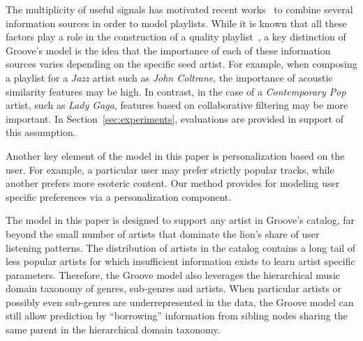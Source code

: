 The multiplicity of useful signals has motivated recent works~\cite{personalized_playlist_schedl,McFee_multi_similarities} to combine several information sources in order to model playlists. %
While it is known that all these factors play a role in the construction of a quality playlist~\cite{Cunningham:06}, a key distinction of Groove's model is the idea that the importance of each of these information sources varies depending on the specific seed artist. For example, when composing a playlist for a \textit{Jazz} artist such as \textit{John Coltrane}, the importance of acoustic similarity features may be high. In contrast, in the case of a \textit{Contemporary Pop} artist, such as \textit{Lady Gaga}, features based on collaborative filtering may be more important. In Section~\ref{sec:experiments}, evaluations are provided in support of this assumption.
 
Another key element of the model in this paper is personalization based on the user. For example, a particular user may prefer strictly popular tracks, while another prefers more esoteric content. %
Our method provides for modeling user specific preferences via a personalization component.



The model in this paper is designed to support any artist in Groove's catalog, far beyond the small number of artists that dominate the lion's share of user listening patterns. The distribution of artists in the catalog contains a long tail of less popular artists for which insufficient information exists to learn artist specific parameters. Therefore, the Groove model also leverages the hierarchical music domain taxonomy of genres, sub-genres and artists. %
When particular artists or possibly even sub-genres are underrepresented in the data, the Groove model can still allow prediction by ``borrowing'' information from sibling nodes sharing the same parent in the hierarchical domain taxonomy. %



